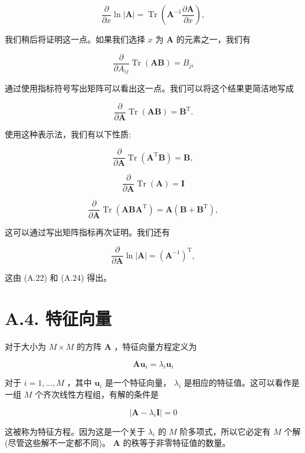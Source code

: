\documentclass[10pt]{article}
\begin{document}
\[
\frac{\partial }{\partial x}\ln \left| \mathbf{A}\right|  = \operatorname{Tr}\left( {{\mathbf{A}}^{-1}\frac{\partial \mathbf{A}}{\partial x}}\right) , \tag{A.22}
\]

我们稍后将证明这一点。如果我们选择 \(x\) 为 \(\mathbf{A}\) 的元素之一，我们有

\[
\frac{\partial }{\partial {A}_{ij}}\operatorname{Tr}\left( \mathbf{{AB}}\right)  = {B}_{ji} \tag{A.23}
\]

通过使用指标符号写出矩阵可以看出这一点。我们可以将这个结果更简洁地写成

\[
\frac{\partial }{\partial \mathbf{A}}\operatorname{Tr}\left( \mathbf{{AB}}\right)  = {\mathbf{B}}^{\mathrm{T}}. \tag{A.24}
\]

使用这种表示法，我们有以下性质:

\[
\frac{\partial }{\partial \mathbf{A}}\operatorname{Tr}\left( {{\mathbf{A}}^{\mathrm{T}}\mathbf{B}}\right)  = \mathbf{B}, \tag{A.25}
\]

\[
\frac{\partial }{\partial \mathbf{A}}\operatorname{Tr}\left( \mathbf{A}\right)  = \mathbf{I} \tag{A.26}
\]

\[
\frac{\partial }{\partial \mathbf{A}}\operatorname{Tr}\left( {\mathbf{{AB}}{\mathbf{A}}^{\mathrm{T}}}\right)  = \mathbf{A}\left( {\mathbf{B} + {\mathbf{B}}^{\mathrm{T}}}\right) , \tag{A.27}
\]

这可以通过写出矩阵指标再次证明。我们还有

\[
\frac{\partial }{\partial \mathbf{A}}\ln \left| \mathbf{A}\right|  = {\left( {\mathbf{A}}^{-1}\right) }^{\mathrm{T}}, \tag{A.28}
\]

这由 (A.22) 和 (A.24) 得出。

\section*{A.4. 特征向量}

对于大小为 \(M \times  M\) 的方阵 \(\mathbf{A}\) ，特征向量方程定义为

\[
\mathbf{A}{\mathbf{u}}_{i} = {\lambda }_{i}{\mathbf{u}}_{i} \tag{A.29}
\]

对于 \(i = 1,\ldots ,M\) ，其中 \({\mathbf{u}}_{i}\) 是一个特征向量， \({\lambda }_{i}\) 是相应的特征值。这可以看作是一组 \(M\) 个齐次线性方程组，有解的条件是

\[
\left| {\mathbf{A} - {\lambda }_{i}\mathbf{I}}\right|  = 0 \tag{A.30}
\]

这被称为特征方程。因为这是一个关于 \({\lambda }_{i}\) 的 \(M\) 阶多项式，所以它必定有 \(M\) 个解(尽管这些解不一定都不同)。 \(\mathbf{A}\) 的秩等于非零特征值的数量。
\end{document}
